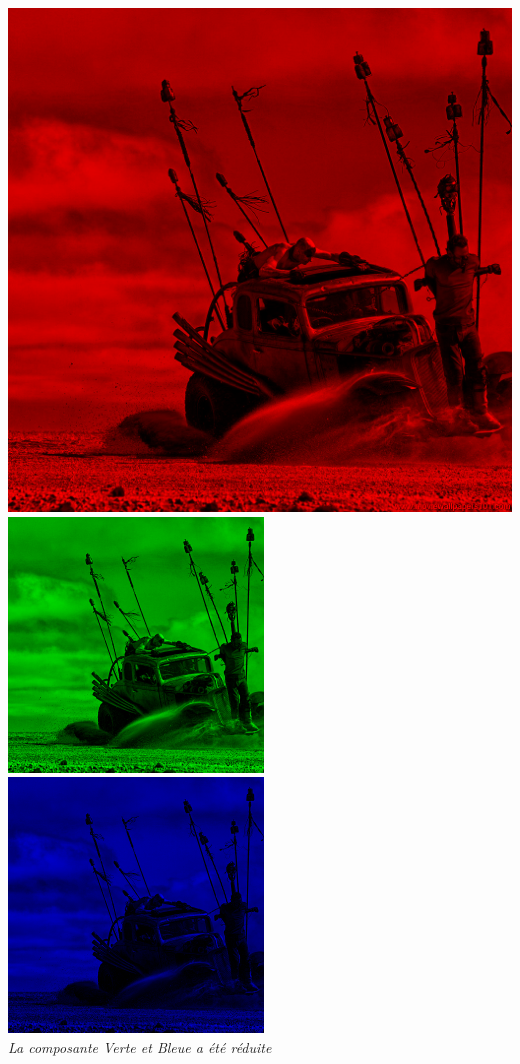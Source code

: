 \documentclass[a4paper,11pt]{article}
\begin{document}
\begin{center}
\includegraphics[scale=0.5]{./imgs/madmax2R.png}
\includegraphics[scale=0.5]{./imgs/madmax2G.png}
\includegraphics[scale=0.5]{./imgs/madmax2B.png}\\
\textit{La composante Verte et Bleue a été réduite}
\end{center}
\end{document}
